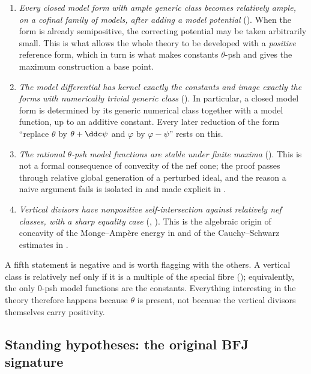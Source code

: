\begin{enumerate}
\item \emph{Every closed model form with ample generic class becomes
 relatively ample, on a cofinal family of models, after adding a model
 potential} ().  When the form is
 already semipositive, the correcting potential may be taken arbitrarily
 small.  This is what allows the whole theory to be developed with a
 \emph{positive} reference form, which in turn is what makes constants
 \(\theta\)-psh and gives the maximum construction a base point.
\item \emph{The model differential has kernel exactly the constants and
 image exactly the forms with numerically trivial generic class}
 ().  In particular, a closed model form is
 determined by its generic numerical class together with a model function,
 up to an additive constant.  Every later reduction of the form ``replace
 \(\theta\) by \(\theta+\ddc\psi\) and \(\varphi\) by \(\varphi-\psi\)''
 rests on this.
\item \emph{The rational \(\theta\)-psh model functions are stable under
 finite maxima} ().  This is not a formal consequence of
 convexity of the nef cone; the proof passes through relative global
 generation of a perturbed ideal, and the reason a naive argument fails is
 isolated in  and made explicit in
 .
\item \emph{Vertical divisors have nonpositive self-intersection against
 relatively nef classes, with a sharp equality case}
 (, ).  This is
 the algebraic origin of concavity of the Monge--Amp\`ere energy in
  and of the Cauchy--Schwarz estimates in
 .
\end{enumerate}

A fifth statement is negative and is worth flagging with the others.  A
vertical class is relatively nef only if it is a multiple of the special
fibre (); equivalently, the only
\(0\)-psh model functions are the constants.  Everything interesting in the
theory therefore happens because \(\theta\) is present, not because the
vertical divisors themselves carry positivity.

\subsection{Standing hypotheses: the original BFJ signature}
\label{sec:ch20-hypotheses}

